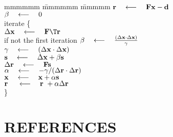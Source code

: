 \label{'cgtemplate'}
\begin{tabbing}
mmmmmm \= mmmmmm \= mmmmm \kill
\> $\bold r \quad\longleftarrow\quad \bold F \bold x - \bold d$ \\
\> $\beta \quad\longleftarrow\quad 0$ \\
\> {\rm iterate \{ }                                               \\
\>      \>  $\Delta \bold x   \padarrow \bold F\T \bold r$          \\
\>      \>  {\rm if not the first iteration} 
$\beta \quad\longleftarrow\quad \frac{ (\Delta \bold x \cdot \Delta \bold x )}
                            { \gamma}$                              \\
\>      \>  $\gamma \quad\longleftarrow\quad (\Delta \bold x \cdot \Delta \bold x )$ \\
\>      \>  $\bold s   \quad\longleftarrow\quad \Delta \bold x + \beta \bold s$      \\
\>      \>  $\Delta \bold r  \quad\longleftarrow\quad \bold F \bold  s$               \\
\>      \> $\alpha \quad\longleftarrow\quad
                - \gamma/
                 (\Delta \bold r \cdot \Delta\bold r )
                $
                \\
\>      \> $\bold x   \quad\longleftarrow\quad \bold x   + \alpha\bold s$              \\
\>      \> $\bold r\  \quad\longleftarrow\quad \bold r\  + \alpha\Delta \bold r$       \\
\>      \> \}                                                   
\end{tabbing}

%
%

\section{REFERENCES}

